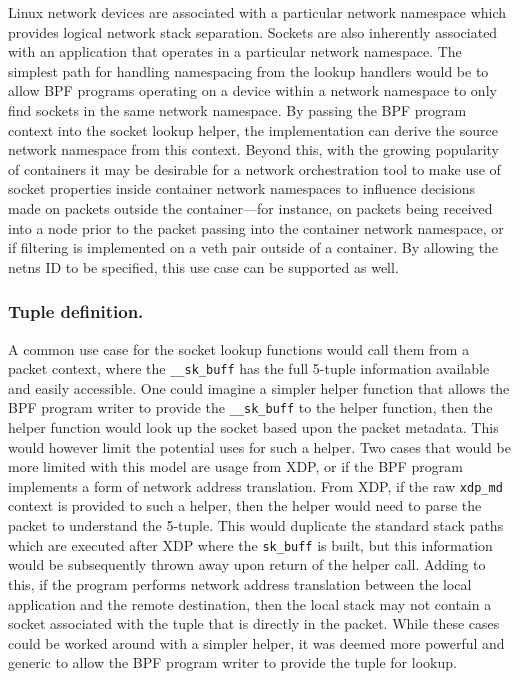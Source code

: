 \documentclass[10pt,sigconf,authorversion]{lpc}
\begin{document}
Linux network devices are associated with a particular network namespace which
provides logical network stack separation. Sockets are also inherently
associated with an application that operates in a particular network namespace.
The simplest path for handling namespacing from the lookup handlers would be to
allow BPF programs operating on a device within a network namespace to only
find sockets in the same network namespace. By passing the BPF program context
into the socket lookup helper, the implementation can derive the source network
namespace from this context. Beyond this, with the growing popularity of
containers it may be desirable for a network orchestration tool to make use of
socket properties inside container network namespaces to influence decisions
made on packets outside the container---for instance, on packets being received
into a node prior to the packet passing into the container network namespace,
or if filtering is implemented on a veth pair outside of a container. By
allowing the netns ID to be specified, this use case can be supported as well.

\subsubsection{Tuple definition.}

A common use case for the socket lookup functions would call them from a packet
context, where the \verb+__sk_buff+ has the full 5-tuple information available
and easily accessible. One could imagine a simpler helper function that allows
the BPF program writer to provide the \verb+__sk_buff+ to the helper function,
then the helper function would look up the socket based upon the packet
metadata. This would however limit the potential uses for such a helper. Two
cases that would be more limited with this model are usage from XDP, or if the
BPF program implements a form of network address translation. From XDP, if the
raw \verb+xdp_md+ context is provided to such a helper, then the helper would
need to parse the packet to understand the 5-tuple. This would duplicate the
standard stack paths which are executed after XDP where the \verb+sk_buff+ is
built, but this information would be subsequently thrown away upon return of
the helper call. Adding to this, if the program performs network address
translation between the local application and the remote destination, then the
local stack may not contain a socket associated with the tuple that is directly
in the packet. While these cases could be worked around with a simpler helper,
it was deemed more powerful and generic to allow the BPF program writer to
provide the tuple for lookup.
\end{document}
